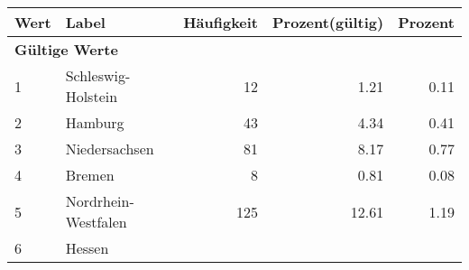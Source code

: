      \begin{longtable}{lXrrr}
     \toprule
     \textbf{Wert} & \textbf{Label} & \textbf{Häufigkeit} & \textbf{Prozent(gültig)} & \textbf{Prozent} \\
     \endhead
     \midrule
     \multicolumn{5}{l}{\textbf{Gültige Werte}}\\

     1 &
     \multicolumn{1}{X}{ Schleswig-Holstein   } &


       \num{12} &
       \num[round-mode=places,round-precision=2]{1,21} &
         \num[round-mode=places,round-precision=2]{0,11} \\

     2 &
     \multicolumn{1}{X}{ Hamburg   } &


       \num{43} &
       \num[round-mode=places,round-precision=2]{4,34} &
         \num[round-mode=places,round-precision=2]{0,41} \\

     3 &
     \multicolumn{1}{X}{ Niedersachsen   } &


       \num{81} &
       \num[round-mode=places,round-precision=2]{8,17} &
         \num[round-mode=places,round-precision=2]{0,77} \\

     4 &
     \multicolumn{1}{X}{ Bremen   } &


       \num{8} &
       \num[round-mode=places,round-precision=2]{0,81} &
         \num[round-mode=places,round-precision=2]{0,08} \\

     5 &
     \multicolumn{1}{X}{ Nordrhein-Westfalen   } &


       \num{125} &
       \num[round-mode=places,round-precision=2]{12,61} &
         \num[round-mode=places,round-precision=2]{1,19} \\

     6 &
     \multicolumn{1}{X}{ Hessen   } &



\end{longtable}
